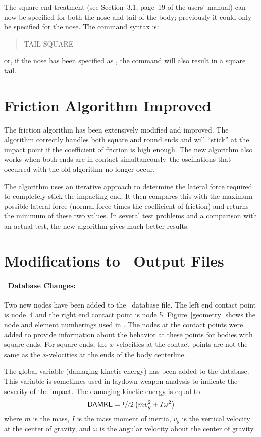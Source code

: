 \begin{memo}
The square end treatment (see Section~3.1, page~19 of the users' manual)
can now be specified for both the nose and tail of the body; previously
it could only be specified for the nose.  The command syntax is:
\begin{quote}
\sf TAIL SQUARE \\
\end{quote}
\rm or, if the nose has been specified as , the  command will also result in a square tail.

\section*{Friction Algorithm Improved}

The friction algorithm has been extensively modified and improved.  The
algorithm correctly handles both square and round ends and will
``stick'' at the impact point if the coefficient of friction is high
enough.  The new algorithm also works when both ends are in contact
simultaneously--the oscillations that occurred with the old algorithm no
longer occur.  

The algorithm uses an iterative approach to determine the lateral force
required to completely stick the impacting end.  It then compares this
with the maximum possible lateral force (normal force times the
coefficient of friction) and returns the minimum of these two values. In
several test problems and a comparison with an actual test, the new
algorithm gives much better results. 

\section*{Modifications to \slap\ Output Files}

\paragraph*{\exo\ Database Changes:} Two new nodes have been added to
the \exo\ database file.  The left end contact point is node~4 and the
right end contact point is node 5. Figure~\ref{geometry} shows the node
and element numberings used in \slap.  The nodes at the contact points
were added to provide information about the behavior at these points for
bodies with square ends. For square ends, the $x$-velocities at the
contact points are not the same as the $x$-velocities at the ends of the
body centerline. 

The global variable  (damaging kinetic energy) has been added
to the database.  This variable is sometimes used in laydown weapon
analysis to indicate the severity of the impact.  The damaging kinetic
energy is equal to 
\begin{displaymath}
\cmd{DAMKE} = \sfrac1/2 \left(m v_y^2 + I \omega^2\right)
\end{displaymath}
where $m$ is the mass, $I$ is the mass moment of inertia, $v_y$ is the
vertical velocity at the center of gravity, and $\omega$ is the angular
velocity about the center of gravity.


\end{memo}
